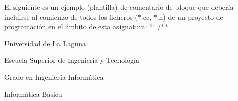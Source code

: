 El siguiente es un ejemplo (plantilla) de comentario de bloque que debería incluirse al comienzo de todos los ficheros ($\ast$.cc, $\ast$.h) de un proyecto de programación en el ámbito de esta asignatura\+: ``` /$\ast$$\ast$
\begin{DoxyItemize}
\item Universidad de La Laguna
\item Escuela Superior de Ingeniería y Tecnología
\item Grado en Ingeniería Informática
\item Informática Básica
\item 
\item 
\end{DoxyItemize}
